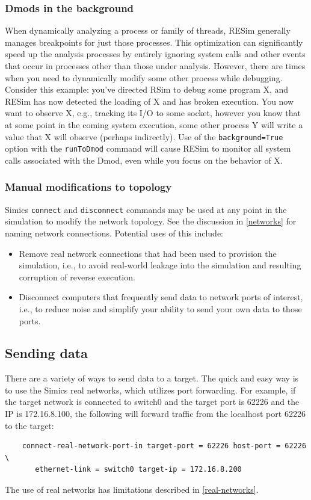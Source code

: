 \documentclass[titlepage]{article}
\begin{document}
\subsubsection{Dmods in the background}
\label{background_dmod}
When dynamically analyzing a process or family of threads, RESim generally manages breakpoints for just those processes.
This optimization can significantly speed up the analysis processes by entirely ignoring system calls and other events
that occur in processes other than those under analysis.  However, there are times when you need to dynamically modify some other
process while debugging.  Consider this example: you've directed RSim to debug some program X, and RESim has now detected
the loading of X and has broken execution.  You now want to observe X, e.g., tracking its I/O to some socket, however you
know that at some point in the coming system execution, some other process Y will write a value that X will observe (perhaps
indirectly).  Use of the {\tt background=True} option with the {\tt runToDmod} command will cause RESim to monitor all
system calls associated with the Dmod, even while you focus on the behavior of X. 

\subsubsection{Manual modifications to topology}
\label{manual_net_mods}
Simics {\tt connect} and {\tt disconnect} commands may be used at any point in the simulation to modify the
network topology.  See the discussion in \ref{networks} for naming network connections.  Potential uses of this include:
\begin{itemize}
\item Remove real network connections that had been used to provision the simulation, i.e., to avoid real-world leakage
into the simulation and resulting corruption of reverse execution.
\item Disconnect computers that frequently send data to network ports of interest, i.e., to reduce noise and simplify your
ability to send your own data to those ports.
\end{itemize}

\subsection{Sending data}
There are a variety of ways to send data to a target.  The quick and easy way is to use the Simics real networks, which utilizes
port forwarding.  For example, if the target network is connected to switch0 and the target port is 62226 and the IP is
172.16.8.100, the following will forward traffic from the localhost port 62226 to the target: 
\begin{verbatim}
    connect-real-network-port-in target-port = 62226 host-port = 62226 \
       ethernet-link = switch0 target-ip = 172.16.8.200
\end{verbatim}
The use of real networks has limitations described in \ref{real-networks}.
\end{document}
